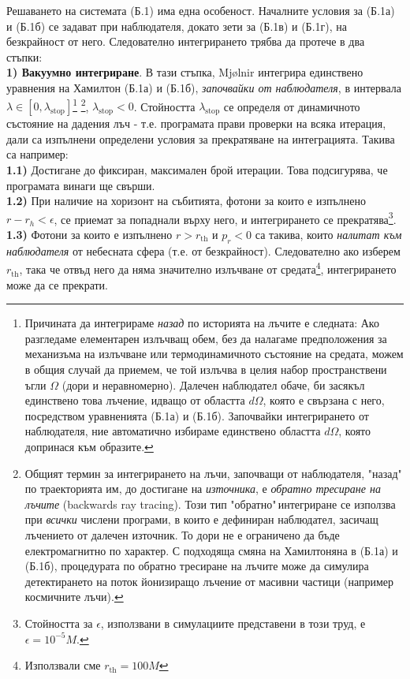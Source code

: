 \begin{appendices}
Решаването на системата (Б.1) има една особеност. Началните условия за (Б.1а) и (Б.1б) се задават при наблюдателя, докато зети за (Б.1в) и (Б.1г), на безкрайност от него. Следователно интегрирането трябва да протече в два стъпки:\\

\textbf{1) Вакуумно интегриране}. В тази стъпка, Mjølnir интегрира единствено уравнения на Хамилтон (Б.1а) и (Б.1б), \emph{започвайки от наблюдателя}, в интервала $\lambda\in[0,\lambda_\text{stop}]$\footnote{Причината да интегрираме \emph{назад} по историята на лъчите е следната: Ако разгледаме елементарен излъчващ обем, без да налагаме предположения за механизъма на излъчване или термодинамичното състояние на средата, можем в общия случай да приемем, че той излъчва в целия набор пространствени ъгли $\Omega$ (дори и неравномерно). Далечен наблюдател обаче, би засякъл единствено това лъчение, идващо от областта $d\Omega$, която е свързана с него, посредством уравненията (Б.1а) и (Б.1б). Започвайки интегрирането от наблюдателя, ние автоматично избираме единствено областта $d\Omega$, която допринася към образите.} \footnote{Общият термин за интегрирането на лъчи, започващи от наблюдателя, "назад" по траекторията им, до достигане на \emph{източника}, е \emph{обратно тресиране на лъчите} (backwards ray tracing). Този тип "обратно"$\,$интегриране се използва при \emph{всички} числени програми, в които е дефиниран наблюдател, засичащ лъчението от далечен източник. То дори не е ограничено да бъде електромагнитно по характер. С подходяща смяна на Хамилтоняна в (Б.1а) и (Б.1б), процедурата по обратно тресиране на лъчите може да симулира детектирането на поток йонизиращо лъчение от масивни частици (например космичните лъчи).}, $\lambda_\text{stop} < 0$. Стойността $\lambda_\text{stop}$ се определя от динамичното състояние на дадения лъч - т.е. програмата прави проверки на всяка итерация, дали са изпълнени определени условия за прекратяване на интеграцията. Такива са например:\\

\indent \textbf{1.1)} Достигане до фиксиран, максимален брой итерации. Това подсигурява, че програмата винаги ще свърши.\\
\indent \textbf{1.2)} При наличие на хоризонт на събитията, фотони за които е изпълнено $r - r_h < \epsilon$, се приемат за попаднали върху него, и интегрирането се прекратява\footnote{Стойността за $\epsilon$, използвани в симулациите представени в този труд, е $\epsilon = 10^{-5}M$.}.\\
\indent \textbf{1.3)} Фотони за които е изпълнено $r > r_{\text{th}}$ и $p_r < 0$ са такива, които \emph{налитат към наблюдателя} от небесната сфера (т.е. от безкрайност). Следователно ако изберем $r_{\text{th}}$, така че отвъд него да няма значително излъчване от средата\footnote{Използвали сме $r_{\text{th}} = 100M$}, интегрирането може да се прекрати.\\


\end{appendices}
